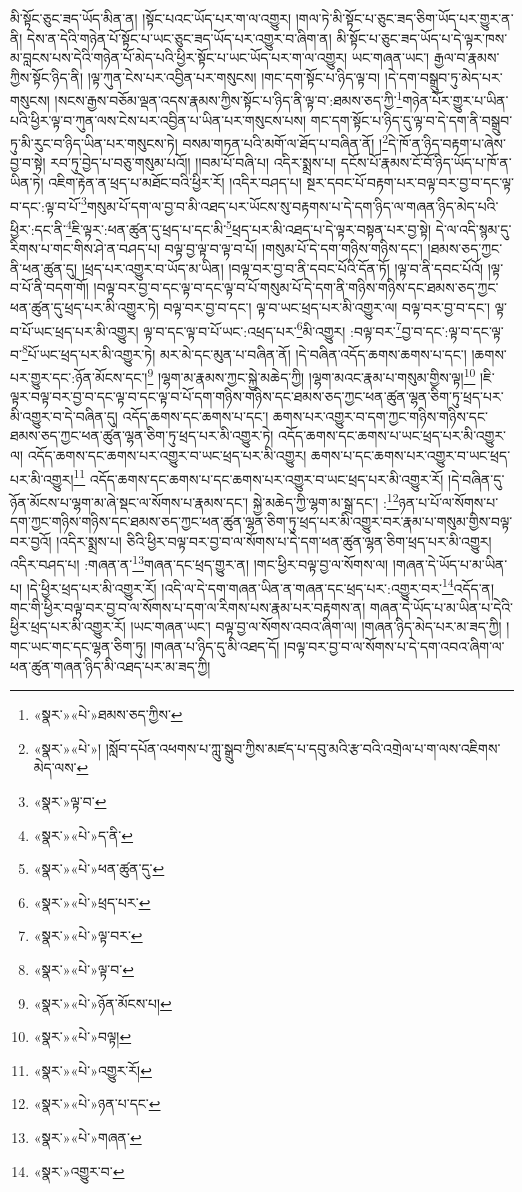 མི་སྟོང་ཅུང་ཟད་ཡོད་མིན་ན། །སྟོང་པའང་ཡོད་པར་ག་ལ་འགྱུར། །གལ་ཏེ་མི་སྟོང་པ་ཅུང་ཟད་ཅིག་ཡོད་པར་གྱུར་ན་ནི། དེས་ན་དེའི་གཉེན་པོ་སྟོང་པ་ཡང་ཅུང་ཟད་ཡོད་པར་འགྱུར་བ་ཞིག་ན། མི་སྟོང་པ་ཅུང་ཟད་ཡོད་པ་དེ་ལྟར་ཁས་མ་བླངས་པས་དེའི་གཉེན་པོ་མེད་པའི་ཕྱིར་སྟོང་པ་ཡང་ཡོད་པར་ག་ལ་འགྱུར། ཡང་གཞན་ཡང་། རྒྱལ་བ་རྣམས་ཀྱིས་སྟོང་ཉིད་ནི། །ལྟ་ཀུན་ངེས་པར་འབྱིན་པར་གསུངས། །གང་དག་སྟོང་པ་ཉིད་ལྟ་བ། །དེ་དག་བསྒྲུབ་ཏུ་མེད་པར་གསུངས། །སངས་རྒྱས་བཅོམ་ལྡན་འདས་རྣམས་ཀྱིས་སྟོང་པ་ཉིད་ནི་ལྟ་བ་:ཐམས་ཅད་ཀྱི་\footnote{«སྣར་»«པེ་»ཐམས་ཅད་ཀྱིས་}གཉེན་པོར་གྱུར་པ་ཡིན་པའི་ཕྱིར་ལྟ་བ་ཀུན་ལས་ངེས་པར་འབྱིན་པ་ཡིན་པར་གསུངས་པས། གང་དག་སྟོང་པ་ཉིད་དུ་ལྟ་བ་དེ་དག་ནི་བསྒྲུབ་ཏུ་མི་རུང་བ་ཉིད་ཡིན་པར་གསུངས་ཏེ། བསམ་གཏན་པའི་མགོ་ལ་ཐོད་པ་བཞིན་ནོ། །\footnote{«སྣར་»«པེ་»། །སློབ་དཔོན་འཕགས་པ་ཀླུ་སྒྲུབ་ཀྱིས་མཛད་པ་དབུ་མའི་རྩ་བའི་འགྲེལ་པ་ག་ལས་འཇིགས་མེད་ལས་}དེ་ཁོ་ན་ཉིད་བརྟག་པ་ཞེས་བྱ་བ་སྟེ། རབ་ཏུ་བྱེད་པ་བཅུ་གསུམ་པའོ།། །།བམ་པོ་བཞི་པ། འདིར་སྨྲས་པ། དངོས་པོ་རྣམས་ངོ་བོ་ཉིད་ཡོད་པ་ཁོ་ན་ཡིན་ཏེ། འཇིག་རྟེན་ན་ཕྲད་པ་མཐོང་བའི་ཕྱིར་རོ། །འདིར་བཤད་པ། སྔར་དབང་པོ་བརྟག་པར་བལྟ་བར་བྱ་བ་དང་ལྟ་བ་དང་:ལྟ་བ་པོ་\footnote{«སྣར་»ལྟ་བ་}གསུམ་པོ་དག་ལ་བྱ་བ་མི་འཐད་པར་ཡོངས་སུ་བརྟགས་པ་དེ་དག་ཉིད་ལ་གཞན་ཉིད་མེད་པའི་ཕྱིར་:དང་ནི་\footnote{«སྣར་»«པེ་»ད་ནི་}ཇི་ལྟར་:ཕན་ཚུན་དུ་ཕྲད་པ་དང་མི་\footnote{«སྣར་»«པེ་»ཕན་ཚུན་དུ་}ཕྲད་པར་མི་འཐད་པ་དེ་ལྟར་བསྟན་པར་བྱ་སྟེ། དེ་ལ་འདི་སྙམ་དུ་རིགས་པ་གང་གིས་ཤེ་ན་བཤད་པ། བལྟ་བྱ་ལྟ་བ་ལྟ་བ་པོ། །གསུམ་པོ་དེ་དག་གཉིས་གཉིས་དང་། །ཐམས་ཅད་ཀྱང་ནི་ཕན་ཚུན་དུ། །ཕྲད་པར་འགྱུར་བ་ཡོད་མ་ཡིན། །བལྟ་བར་བྱ་བ་ནི་དབང་པོའི་དོན་ཏོ། །ལྟ་བ་ནི་དབང་པོའོ། །ལྟ་བ་པོ་ནི་བདག་གོ། །བལྟ་བར་བྱ་བ་དང་ལྟ་བ་དང་ལྟ་བ་པོ་གསུམ་པོ་དེ་དག་ནི་གཉིས་གཉིས་དང་ཐམས་ཅད་ཀྱང་ཕན་ཚུན་དུ་ཕྲད་པར་མི་འགྱུར་ཏེ། བལྟ་བར་བྱ་བ་དང་། ལྟ་བ་ཡང་ཕྲད་པར་མི་འགྱུར་ལ། བལྟ་བར་བྱ་བ་དང་། ལྟ་བ་པོ་ཡང་ཕྲད་པར་མི་འགྱུར། ལྟ་བ་དང་ལྟ་བ་པོ་ཡང་:འཕྲད་པར་\footnote{«སྣར་»«པེ་»ཕྲད་པར་}མི་འགྱུར། :བལྟ་བར་\footnote{«སྣར་»«པེ་»ལྟ་བར་}བྱ་བ་དང་:ལྟ་བ་དང་ལྟ་བ་\footnote{«སྣར་»«པེ་»ལྟ་བ་}པོ་ཡང་ཕྲད་པར་མི་འགྱུར་ཏེ། མར་མེ་དང་མུན་པ་བཞིན་ནོ། །དེ་བཞིན་འདོད་ཆགས་ཆགས་པ་དང་། །ཆགས་པར་གྱུར་དང་:ཉོན་མོངས་དང་།\footnote{«སྣར་»«པེ་»ཉོན་མོངས་པ།} །ལྷག་མ་རྣམས་ཀྱང་སྐྱེ་མཆེད་ཀྱི། །ལྷག་མའང་རྣམ་པ་གསུམ་གྱིས་ལྟ།\footnote{«སྣར་»«པེ་»བལྟ།} །ཇི་ལྟར་བལྟ་བར་བྱ་བ་དང་ལྟ་བ་དང་ལྟ་བ་པོ་དག་གཉིས་གཉིས་དང་ཐམས་ཅད་ཀྱང་ཕན་ཚུན་ལྷན་ཅིག་ཏུ་ཕྲད་པར་མི་འགྱུར་བ་དེ་བཞིན་དུ། འདོད་ཆགས་དང་ཆགས་པ་དང་། ཆགས་པར་འགྱུར་བ་དག་ཀྱང་གཉིས་གཉིས་དང་ཐམས་ཅད་ཀྱང་ཕན་ཚུན་ལྷན་ཅིག་ཏུ་ཕྲད་པར་མི་འགྱུར་ཏེ། འདོད་ཆགས་དང་ཆགས་པ་ཡང་ཕྲད་པར་མི་འགྱུར་ལ། འདོད་ཆགས་དང་ཆགས་པར་འགྱུར་བ་ཡང་ཕྲད་པར་མི་འགྱུར། ཆགས་པ་དང་ཆགས་པར་འགྱུར་བ་ཡང་ཕྲད་པར་མི་འགྱུར།\footnote{«སྣར་»«པེ་»འགྱུར་རོ།} འདོད་ཆགས་དང་ཆགས་པ་དང་ཆགས་པར་འགྱུར་བ་ཡང་ཕྲད་པར་མི་འགྱུར་རོ། །དེ་བཞིན་དུ་ཉོན་མོངས་པ་ལྷག་མ་ཞེ་སྡང་ལ་སོགས་པ་རྣམས་དང་། སྐྱེ་མཆེད་ཀྱི་ལྷག་མ་སྒྲ་དང་། :\footnote{«སྣར་»«པེ་»ཉན་པ་དང་}ཉན་པ་པོ་ལ་སོགས་པ་དག་ཀྱང་གཉིས་གཉིས་དང་ཐམས་ཅད་ཀྱང་ཕན་ཚུན་ལྷན་ཅིག་ཏུ་ཕྲད་པར་མི་འགྱུར་བར་རྣམ་པ་གསུམ་གྱིས་བལྟ་བར་བྱའོ། །འདིར་སྨྲས་པ། ཅིའི་ཕྱིར་བལྟ་བར་བྱ་བ་ལ་སོགས་པ་དེ་དག་ཕན་ཚུན་ལྷན་ཅིག་ཕྲད་པར་མི་འགྱུར། འདིར་བཤད་པ། :གཞན་ན་\footnote{«སྣར་»«པེ་»གཞན་}གཞན་དང་ཕྲད་གྱུར་ན། །གང་ཕྱིར་བལྟ་བྱ་ལ་སོགས་ལ། །གཞན་དེ་ཡོད་པ་མ་ཡིན་པ། །དེ་ཕྱིར་ཕྲད་པར་མི་འགྱུར་རོ། །འདི་ལ་དེ་དག་གཞན་ཡིན་ན་གཞན་དང་ཕྲད་པར་:འགྱུར་བར་\footnote{«སྣར་»འགྱུར་བ་}འདོད་ན། གང་གི་ཕྱིར་བལྟ་བར་བྱ་བ་ལ་སོགས་པ་དག་ལ་རིགས་པས་རྣམ་པར་བརྟགས་ན། གཞན་དེ་ཡོད་པ་མ་ཡིན་པ་དེའི་ཕྱིར་ཕྲད་པར་མི་འགྱུར་རོ། །ཡང་གཞན་ཡང་། བལྟ་བྱ་ལ་སོགས་འབའ་ཞིག་ལ། །གཞན་ཉིད་མེད་པར་མ་ཟད་ཀྱི། །གང་ཡང་གང་དང་ལྷན་ཅིག་ཏུ། །གཞན་པ་ཉིད་དུ་མི་འཐད་དོ། །བལྟ་བར་བྱ་བ་ལ་སོགས་པ་དེ་དག་འབའ་ཞིག་ལ་ཕན་ཚུན་གཞན་ཉིད་མི་འཐད་པར་མ་ཟད་ཀྱི། 